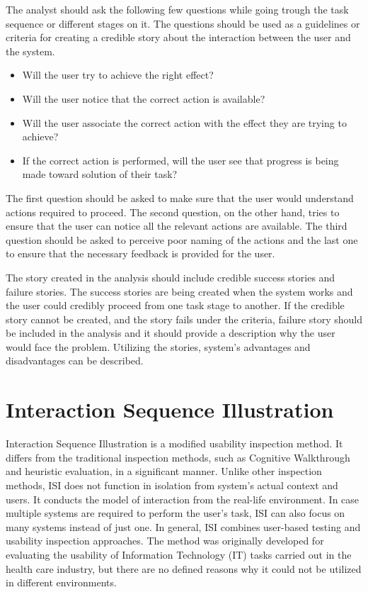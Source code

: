\documentclass[12pt,a4paper,oneside,pdftex]{report}
\begin{document}
The analyst should ask the following few questions while going trough the task sequence or different stages on it. The questions should be used as a guidelines or criteria for creating a credible story about the interaction between the user and the system. \cite{RefWorks:26}
\begin{itemize}
\item Will the user try to achieve the right effect?
\item Will the user notice that the correct action is available?
\item Will the user associate the correct action with the effect they are trying to achieve?
\item If the correct action is performed, will the user see that progress is being made toward solution of their task?
\end{itemize}

The first question should be asked to make sure that the user would understand actions required to proceed. The second question, on the other hand, tries to ensure that the user can notice all the relevant actions are available.
The third question should be asked to perceive poor naming of the actions and the last one to ensure that the necessary feedback is provided for the user. 

The story created in the analysis should include credible success stories and failure stories. The success stories are being created when the system works and the user could credibly proceed from one task stage to another. If the credible story cannot be created, and the story fails under the criteria, failure story should be included in the analysis and it should provide a description why the user would face the problem. Utilizing the stories, system's advantages and disadvantages can be described. \cite{RefWorks:26} 		

\section{Interaction Sequence Illustration}
\label{sec:isi}
Interaction Sequence Illustration is a modified usability inspection method. It differs from the traditional inspection methods, such as Cognitive Walkthrough and heuristic evaluation, in a significant manner. Unlike other inspection methods, ISI does not function in isolation from system's actual context and users. It conducts the model of interaction from the real-life environment. In case multiple systems are required to perform the user's task, ISI can also focus on many systems instead of just one. In general, ISI combines user-based testing and usability inspection approaches. The method was originally developed for evaluating the usability of Information Technology (IT) tasks carried out in the health care industry, but there are no defined reasons why it could not be utilized in different environments.  \cite{RefWorks:17} 
\end{document}
